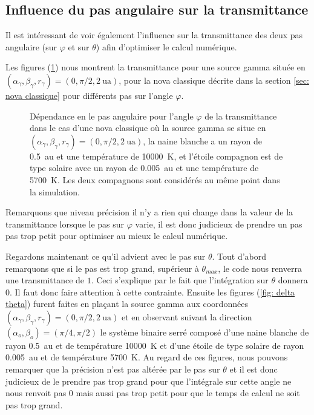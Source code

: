 \documentclass[a4paper,12pt,twoside]{article}
\begin{document}
\subsection{Influence du pas angulaire sur la transmittance}

Il est intéressant de voir également l'influence sur la transmittance des deux pas angulaire (sur $\varphi$ et sur $\theta$) afin d'optimiser le calcul numérique.

Les figures (\ref{fig: delta phi}) nous montrent la transmittance pour une source gamma située en $(\alpha_\gamma, \beta_\gamma, r_\gamma) = (0, \pi/2, \SI{2}{\astronomicalunit})$, pour la nova classique décrite dans la section \ref{sec: nova classique} pour différents pas sur l'angle $\varphi$.

\begin{figure}[H]
	\centering
    \hfill
    \hfill
    \caption{Dépendance en le pas angulaire pour l'angle $\varphi$ de la transmittance dans le cas d'une nova classique où la source gamma se situe en $(\alpha_\gamma, \beta_\gamma, r_\gamma) = (0, \pi/2, \SI{2}{\astronomicalunit})$, la naine blanche a un rayon de \SI{0.5}{\astronomicalunit} et une température de \SI{10000}{\K}, et l'étoile compagnon est de type solaire avec un rayon de \SI{0.005}{\astronomicalunit} et une température de \SI{5700}{\K}. Les deux compagnons sont considérés au même point dans la simulation.}
    \label{fig: delta phi}
\end{figure}

Remarquons que niveau précision il n'y a rien qui change dans la valeur de la transmittance lorsque le pas sur $\varphi$ varie, il est donc judicieux de prendre un pas pas trop petit pour optimiser au mieux le calcul numérique.

Regardons maintenant ce qu'il advient avec le pas sur $\theta$. Tout d'abord remarquons que si le pas est trop grand, supérieur à $\theta_{max}$, le code nous renverra une transmittance de $1$. Ceci s'explique par le fait que l'intégration sur $\theta$ donnera $0$. Il faut donc faire attention à cette contrainte. Ensuite les figures (\ref{fig: delta theta}) furent faites en plaçant la source gamma aux coordonnées $(\alpha_\gamma, \beta_\gamma, r_\gamma) = (0, \pi/2, \SI{2}{\astronomicalunit})$ et en observant suivant la direction $(\alpha_o, \beta_o) = (\pi/4, \pi/2)$ le système binaire serré composé d'une naine blanche de rayon \SI{0.5}{\astronomicalunit} et de température \SI{10000}{\K} et d'une étoile de type solaire de rayon \SI{0.005}{\astronomicalunit} et de température \SI{5700}{\K}. Au regard de ces figures, nous pouvons remarquer que la précision n'est pas altérée par le pas sur $\theta$ et il est donc judicieux de le prendre pas trop grand pour que l'intégrale sur cette angle ne nous renvoit pas $0$ mais aussi pas trop petit pour que le temps de calcul ne soit pas trop grand.
\end{document}
